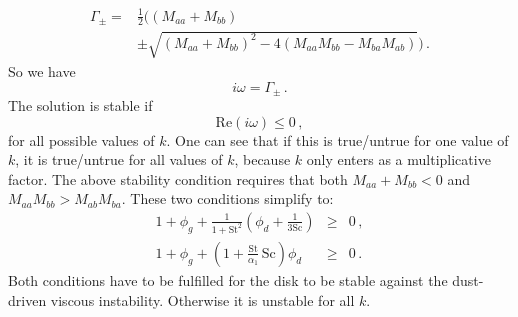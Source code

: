 \documentclass{aa}
\def\comma{\,,}
\def\fullstop{\,.}
\newcommand{\revised}[1]{{#1}}
\begin{document}
\begin{equation}\label{eq-gamma-pm}
  \begin{split}
    \Gamma_{\pm} =& \frac{1}{2}\bigg((M_{aa}+M_{bb}) \\
&   \pm \sqrt{(M_{aa}+M_{bb})^2-4(M_{aa}M_{bb}-M_{ba}M_{ab})}\bigg)\fullstop
  \end{split}
\end{equation}
So we have
\begin{equation}\label{eq-iomega-from-gamma}
i\omega = \Gamma_{\pm}\fullstop
\end{equation}
The solution is stable if
\begin{equation}
\mathrm{Re}(i\omega) \le 0\comma
\end{equation}
for all possible \revised{values of $k$. One can see that if this is true/untrue
  for one value of $k$, it is true/untrue for all values of $k$, because $k$
  only enters as a multiplicative factor. The above stability condition
  requires that both $M_{aa}+M_{bb}<0$ and $M_{aa}M_{bb}>M_{ab}M_{ba}$.
  These two conditions simplify to:}
\begin{eqnarray}
  1+\phi_g + \frac{1}{1+\mathrm{St}^2}\left(\phi_d + \frac{1}{3\mathrm{Sc}}\right) &\ge& 0\comma
\label{eq-stability-criterion-simple-1}\\
  1+\phi_g + \left(1 + \frac{\mathrm{St}}{\alpha_1}\,\mathrm{Sc}\right)\phi_d &\ge& 0\fullstop
\label{eq-stability-criterion-simple-2}
\end{eqnarray}
\revised{Both conditions have to be fulfilled for the disk to be stable against
the dust-driven viscous instability. Otherwise it is unstable for all $k$.}
\end{document}
